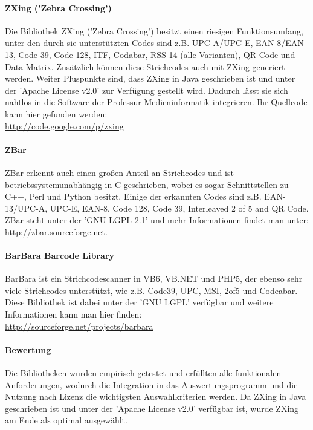 \paragraph*{ZXing ('Zebra Crossing')}
\label{sec:zxing}
Die Bibliothek ZXing ('Zebra Crossing') besitzt einen riesigen Funktionsumfang, unter den durch sie unterstützten Codes sind z.B. UPC-A/UPC-E, EAN-8/EAN-13, Code 39, Code 128, ITF, Codabar, RSS-14 (alle Varianten), QR Code und Data Matrix. Zusätzlich können diese Strichcodes auch mit ZXing generiert werden. Weiter Pluspunkte sind, dass ZXing in Java geschrieben ist und unter der 'Apache License v2.0' zur Verfügung gestellt wird. Dadurch lässt sie sich nahtlos in die Software der Professur Medieninformatik integrieren. Ihr Quell\-code kann hier gefunden werden:\\
\url{http://code.google.com/p/zxing}

\paragraph*{ZBar}
ZBar erkennt auch einen großen Anteil an Strichcodes und ist betriebssystem\-unabhängig in C geschrieben, wobei es sogar Schnittstellen zu C++, Perl und Python besitzt. Einige der erkannten Codes sind z.B. EAN-13/UPC-A, UPC-E, EAN-8, Code 128, Code 39, Interleaved 2 of 5 and QR Code. ZBar steht unter der 'GNU LGPL 2.1' und mehr Informationen findet man unter:\\
\url{http://zbar.sourceforge.net}.

\paragraph*{BarBara Barcode Library}
BarBara ist ein Strichcodescanner in VB6, VB.NET und PHP5, der ebenso sehr viele Strichcodes unterstützt, wie z.B. Code39, UPC, MSI, 2of5 und Codeabar. Diese Bibliothek ist dabei unter der 'GNU LGPL' verfügbar und weitere Informationen kann man hier finden:\\
\url{http://sourceforge.net/projects/barbara}

\paragraph*{Bewertung}
Die Bibliotheken wurden empirisch getestet und erfüllten alle funktionalen Anforderungen, wodurch die Integration in das Auswertungsprogramm und die Nutzung nach Lizenz die wichtigsten Auswahlkriterien werden. Da ZXing in Java geschrieben ist und unter der 'Apache License v2.0' verfügbar ist, wurde ZXing am Ende als optimal ausgewählt.